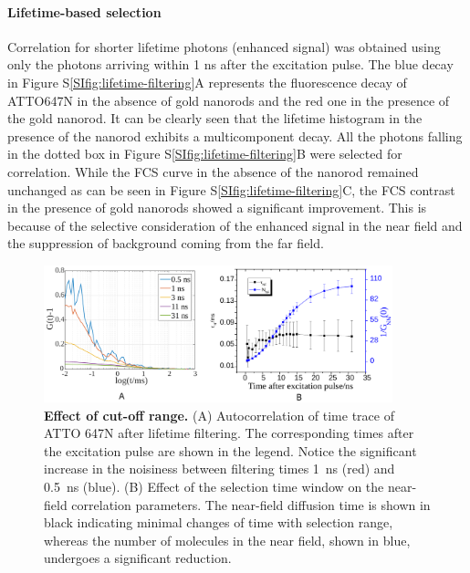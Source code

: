 \paragraph*{Lifetime-based selection}
Correlation for shorter lifetime photons (enhanced signal) was obtained using only the photons arriving within 1 ns after the excitation pulse.
The blue decay in Figure S\ref{SIfig:lifetime-filtering}A represents the fluorescence decay of ATTO647N in the absence of gold nanorods and the red one in the presence of the gold nanorod. It can be clearly seen that the lifetime histogram in the presence of the nanorod exhibits a multicomponent decay.
All the photons falling in the dotted box in Figure S\ref{SIfig:lifetime-filtering}B were selected for correlation.
While the FCS curve in the absence of the nanorod remained unchanged as can be seen in Figure S\ref{SIfig:lifetime-filtering}C, the FCS contrast in the presence of gold nanorods showed a significant improvement.
This is because of the selective consideration of the enhanced signal in the near field and the suppression of background coming from the far field.

\begin{figure}[ht]
  \centering
  \includegraphics[width=0.9\textwidth]{cutoff_effect}
  \makeatletter
  \renewcommand{\fnum@figure}{\figurename~S\thefigure}
  \makeatother{}
  \caption{\textbf{Effect of cut-off range.} (A) Autocorrelation of time trace of ATTO 647N after lifetime filtering.
  The corresponding times after the excitation pulse are shown in the legend.
  Notice the significant increase in the noisiness between filtering times \SI{1}{\ns} (red) and \SI{0.5}{\ns} (blue).
  (B) Effect of the selection time window on the near-field correlation parameters.
  The near-field diffusion time is shown in black indicating minimal changes of time with selection range, whereas the number of molecules in the near field, shown in blue, undergoes a significant reduction.}
  \label{SIfig:cutoff-effect}
\end{figure}

\newpage
